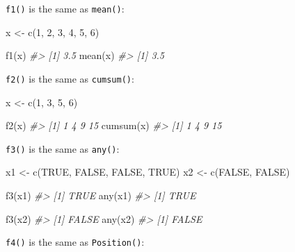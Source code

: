 \documentclass[
]{book}
\newenvironment{Shaded}{\begin{snugshade}}{\end{snugshade}}
\newcommand{\CommentTok}[1]{\textcolor[rgb]{0.56,0.35,0.01}{\textit{#1}}}
\newcommand{\ConstantTok}[1]{\textcolor[rgb]{0.00,0.00,0.00}{#1}}
\newcommand{\DecValTok}[1]{\textcolor[rgb]{0.00,0.00,0.81}{#1}}
\newcommand{\FunctionTok}[1]{\textcolor[rgb]{0.00,0.00,0.00}{#1}}
\newcommand{\NormalTok}[1]{#1}
\newcommand{\OtherTok}[1]{\textcolor[rgb]{0.56,0.35,0.01}{#1}}
\begin{document}
\texttt{f1()} is the same as \texttt{mean()}:

\begin{Shaded}
\begin{Highlighting}[]
\NormalTok{x }\OtherTok{\textless{}{-}} \FunctionTok{c}\NormalTok{(}\DecValTok{1}\NormalTok{, }\DecValTok{2}\NormalTok{, }\DecValTok{3}\NormalTok{, }\DecValTok{4}\NormalTok{, }\DecValTok{5}\NormalTok{, }\DecValTok{6}\NormalTok{)}

\FunctionTok{f1}\NormalTok{(x)}
\CommentTok{\#\textgreater{} [1] 3.5}
\FunctionTok{mean}\NormalTok{(x)}
\CommentTok{\#\textgreater{} [1] 3.5}
\end{Highlighting}
\end{Shaded}

\texttt{f2()} is the same as \texttt{cumsum()}:

\begin{Shaded}
\begin{Highlighting}[]
\NormalTok{x }\OtherTok{\textless{}{-}} \FunctionTok{c}\NormalTok{(}\DecValTok{1}\NormalTok{, }\DecValTok{3}\NormalTok{, }\DecValTok{5}\NormalTok{, }\DecValTok{6}\NormalTok{)}

\FunctionTok{f2}\NormalTok{(x)}
\CommentTok{\#\textgreater{} [1]  1  4  9 15}
\FunctionTok{cumsum}\NormalTok{(x)}
\CommentTok{\#\textgreater{} [1]  1  4  9 15}
\end{Highlighting}
\end{Shaded}

\texttt{f3()} is the same as \texttt{any()}:

\begin{Shaded}
\begin{Highlighting}[]
\NormalTok{x1 }\OtherTok{\textless{}{-}} \FunctionTok{c}\NormalTok{(}\ConstantTok{TRUE}\NormalTok{, }\ConstantTok{FALSE}\NormalTok{, }\ConstantTok{FALSE}\NormalTok{, }\ConstantTok{TRUE}\NormalTok{)}
\NormalTok{x2 }\OtherTok{\textless{}{-}} \FunctionTok{c}\NormalTok{(}\ConstantTok{FALSE}\NormalTok{, }\ConstantTok{FALSE}\NormalTok{)}

\FunctionTok{f3}\NormalTok{(x1)}
\CommentTok{\#\textgreater{} [1] TRUE}
\FunctionTok{any}\NormalTok{(x1)}
\CommentTok{\#\textgreater{} [1] TRUE}

\FunctionTok{f3}\NormalTok{(x2)}
\CommentTok{\#\textgreater{} [1] FALSE}
\FunctionTok{any}\NormalTok{(x2)}
\CommentTok{\#\textgreater{} [1] FALSE}
\end{Highlighting}
\end{Shaded}

\texttt{f4()} is the same as \texttt{Position()}:
\end{document}
